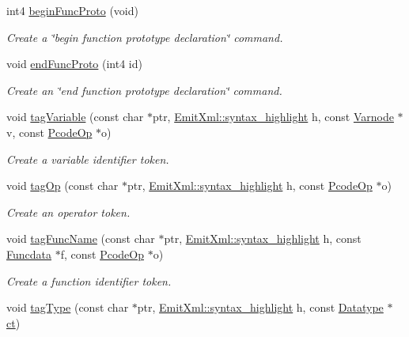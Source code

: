 \begin{DoxyCompactItemize}
int4 \mbox{\hyperlink{class_token_split_a1b95fd9e440ec5036959e32667561885}{begin\+Func\+Proto}} (void)
\begin{DoxyCompactList}\small\item\em Create a \char`\"{}begin function prototype declaration\char`\"{} command. \end{DoxyCompactList}\item 
void \mbox{\hyperlink{class_token_split_a326e6e6c122f24b053e0653c9f18ac79}{end\+Func\+Proto}} (int4 id)
\begin{DoxyCompactList}\small\item\em Create an \char`\"{}end function prototype declaration\char`\"{} command. \end{DoxyCompactList}\item 
void \mbox{\hyperlink{class_token_split_a62826b72072c3b314d73db6b74d6c408}{tag\+Variable}} (const char $\ast$ptr, \mbox{\hyperlink{class_emit_xml_a7c3577436da429c3c75f4b82cac6864f}{Emit\+Xml\+::syntax\+\_\+highlight}} h, const \mbox{\hyperlink{class_varnode}{Varnode}} $\ast$v, const \mbox{\hyperlink{class_pcode_op}{Pcode\+Op}} $\ast$o)
\begin{DoxyCompactList}\small\item\em Create a variable identifier token. \end{DoxyCompactList}\item 
void \mbox{\hyperlink{class_token_split_a84352935d3d283ca1c83c08c79ae4d30}{tag\+Op}} (const char $\ast$ptr, \mbox{\hyperlink{class_emit_xml_a7c3577436da429c3c75f4b82cac6864f}{Emit\+Xml\+::syntax\+\_\+highlight}} h, const \mbox{\hyperlink{class_pcode_op}{Pcode\+Op}} $\ast$o)
\begin{DoxyCompactList}\small\item\em Create an operator token. \end{DoxyCompactList}\item 
void \mbox{\hyperlink{class_token_split_a55215c1471c0be925a2008b73169b56b}{tag\+Func\+Name}} (const char $\ast$ptr, \mbox{\hyperlink{class_emit_xml_a7c3577436da429c3c75f4b82cac6864f}{Emit\+Xml\+::syntax\+\_\+highlight}} h, const \mbox{\hyperlink{class_funcdata}{Funcdata}} $\ast$f, const \mbox{\hyperlink{class_pcode_op}{Pcode\+Op}} $\ast$o)
\begin{DoxyCompactList}\small\item\em Create a function identifier token. \end{DoxyCompactList}\item 
void \mbox{\hyperlink{class_token_split_a52bc265405c6aba947a400a4d2964981}{tag\+Type}} (const char $\ast$ptr, \mbox{\hyperlink{class_emit_xml_a7c3577436da429c3c75f4b82cac6864f}{Emit\+Xml\+::syntax\+\_\+highlight}} h, const \mbox{\hyperlink{class_datatype}{Datatype}} $\ast$\mbox{\hyperlink{class_token_split_a8966907dba26ba691ffec5cde4676958}{ct}})

\end{DoxyCompactItemize}
